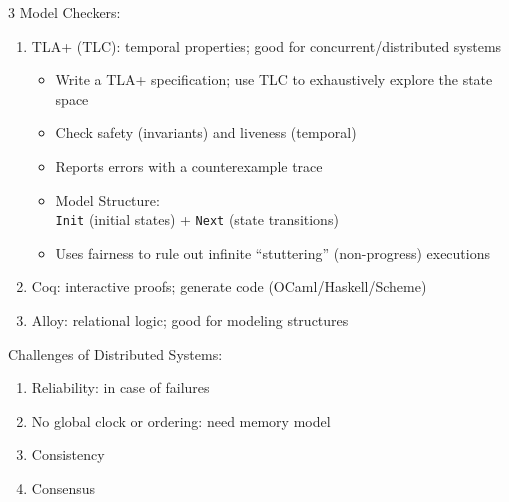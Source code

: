 \documentclass[12pt, a4paper]{article}
\begin{document}
\begin{multicols*}{3}
Model Checkers:
\begin{enumerate}[\roman*.]
  \item TLA+ (TLC): temporal properties; good for concurrent/distributed systems
  \begin{itemize}[leftmargin=*]\vspace{3pt}
    \item Write a TLA+ specification; use TLC to exhaustively explore the state space
    \item Check safety (invariants) and liveness (temporal)
    \item Reports errors with a counterexample trace 
    \item Model Structure:\\\lstinline|Init| (initial states) + \lstinline|Next| (state transitions)
    \item Uses fairness to rule out infinite ``stuttering'' (non-progress) executions
    \end{itemize}
  \item Coq: interactive proofs; generate code (OCaml/Haskell/Scheme)
  \item Alloy: relational logic; good for modeling structures
\end{enumerate}

Challenges of Distributed Systems:
\begin{enumerate}[\roman*.]
  \item Reliability: in case of failures 
  \item No global clock or ordering: need memory model 
  \item Consistency 
  \item Consensus
\end{enumerate}
\end{multicols*}
\end{document}
